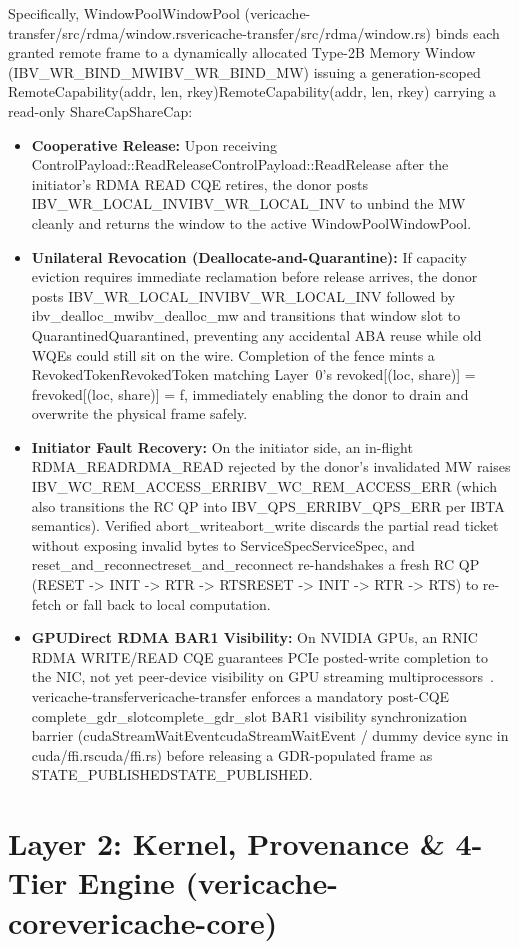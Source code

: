 \documentclass[11pt,a4paper]{article}
\let\origunderscore\_
\DeclareRobustCommand{\code}[1]{{\ttfamily\ifmmode #1\else\def\_{\origunderscore\hspace{0pt}}#1\fi}}
\begin{document}
Specifically, \code{WindowPool} (\code{vericache-transfer/src/rdma/window.rs}) binds each granted remote frame to a dynamically allocated Type-2B Memory Window (\code{IBV\_WR\_BIND\_MW}) issuing a generation-scoped \code{RemoteCapability(addr, len, rkey)} carrying a read-only \code{ShareCap}:
\begin{itemize}
  \item \textbf{Cooperative Release:} Upon receiving \code{ControlPayload::ReadRelease} after the initiator's RDMA READ CQE retires, the donor posts \code{IBV\_WR\_LOCAL\_INV} to unbind the MW cleanly and returns the window to the active \code{WindowPool}.
  \item \textbf{Unilateral Revocation (Deallocate-and-Quarantine):} If capacity eviction requires immediate reclamation before release arrives, the donor posts \code{IBV\_WR\_LOCAL\_INV} followed by \code{ibv\_dealloc\_mw} and transitions that window slot to \code{Quarantined}, preventing any accidental ABA reuse while old WQEs could still sit on the wire. Completion of the fence mints a \code{RevokedToken} matching Layer~0's \code{revoked[(loc, share)] = f}, immediately enabling the donor to drain and overwrite the physical frame safely.
  \item \textbf{Initiator Fault Recovery:} On the initiator side, an in-flight \code{RDMA\_READ} rejected by the donor's invalidated MW raises \code{IBV\_WC\_REM\_ACCESS\_ERR} (which also transitions the RC QP into \code{IBV\_QPS\_ERR} per IBTA semantics). Verified \code{abort\_write} discards the partial read ticket without exposing invalid bytes to \code{ServiceSpec}, and \code{reset\_and\_reconnect} re-handshakes a fresh RC QP (\code{RESET -> INIT -> RTR -> RTS}) to re-fetch or fall back to local computation.
  \item \textbf{GPUDirect RDMA BAR1 Visibility:} On NVIDIA GPUs, an RNIC RDMA WRITE/READ CQE guarantees PCIe posted-write completion to the NIC, not yet peer-device visibility on GPU streaming multiprocessors~\cite{gpudirect}. \code{vericache-transfer} enforces a mandatory post-CQE \code{complete\_gdr\_slot} BAR1 visibility synchronization barrier (\code{cudaStreamWaitEvent} / dummy device sync in \code{cuda/ffi.rs}) before releasing a GDR-populated frame as \code{STATE\_PUBLISHED}.
\end{itemize}

\section{Layer 2: Kernel, Provenance \& 4-Tier Engine (\code{vericache-core})}
\label{sec:core}
\end{document}
